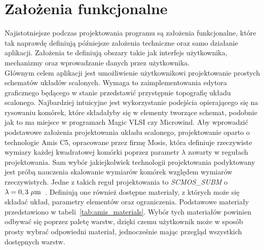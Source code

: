 \section{Założenia funkcjonalne}
\label{sec:zalozenia_funkcjonalne}

Najistotniejsze podczas projektowania programu są założenia funkcjonalne,
które tak naprawdę definiują późniejsze założenia techniczne oraz samo działanie aplikacji.
Założenia te definiują obszary takie jak interfejs użytkownika, mechanizmy oraz wprowadzanie danych przez użytkownika.\\
\indent Głównym celem aplikacji jest umożliwienie użytkownikowi projektowanie prostych schematów układów scalonych.
Wymaga to zaimplementowania edytora graficznego będącego w stanie przedstawić przystępnie topografię układu scalonego.
Najbardziej intuicyjne jest wykorzystanie podejścia opierającego się na rysowaniu komórek,
które składałyby się w elementy tworzące schemat, podobnie jak to ma miejsce w programach Magic VLSI czy Microwind.
Aby wprowadzić podstawowe założenia projektowania układu scalonego, projektowanie oparto o technologie Amis C5,
opracowane przez firmę Mosis,
która definiuje rzeczywiste wymiary każdej kwadratowej komórki poprzez parametr $\lambda$
zawarty w regułach projektowania.
Sam wybór jakiejkolwiek technologii projektowania podyktowany
jest próbą nauczenia skalowanie wymiarów komórek względem wymiarów rzeczywistych.
Jedne z takich reguł projektowania to \textit{SCMOS\_SUBM} o $\lambda=0,3~\text{$\mu$m}$~\cite{amis_c5, amis_params}.
Definiują one również dostępne materiały, z których może się składać układ, parametry elementów oraz ograniczenia.
Podstawowe materiały przedstawiono w tabeli~\ref{tab:amis_materials}.
Wybór tych materiałów powinien odbywać się poprzez paletę warstw,
dzięki czemu użytkownik może w sposób prosty wybrać odpowiedni materiał,
jednocześnie mając przegląd wszystkich dostępnych warstw. 

